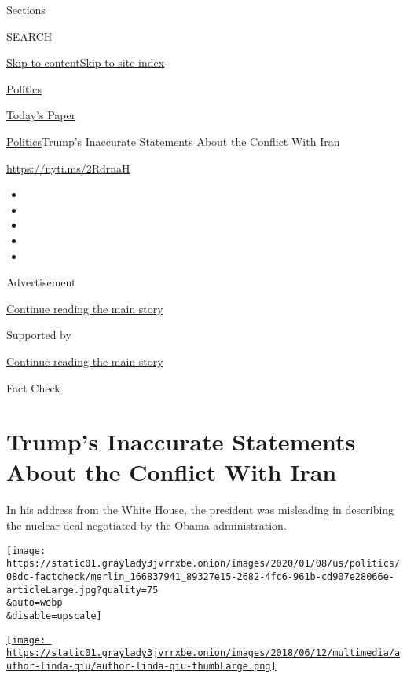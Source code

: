 Sections

SEARCH

\protect\hyperlink{site-content}{Skip to
content}\protect\hyperlink{site-index}{Skip to site index}

\href{https://www.nytimes3xbfgragh.onion/section/politics}{Politics}

\href{https://myaccount.nytimes3xbfgragh.onion/auth/login?response_type=cookie\&client_id=vi}{}

\href{https://www.nytimes3xbfgragh.onion/section/todayspaper}{Today's
Paper}

\href{/section/politics}{Politics}\textbar{}Trump's Inaccurate
Statements About the Conflict With Iran

\url{https://nyti.ms/2RdrnaH}

\begin{itemize}
\item
\item
\item
\item
\item
\end{itemize}

Advertisement

\protect\hyperlink{after-top}{Continue reading the main story}

Supported by

\protect\hyperlink{after-sponsor}{Continue reading the main story}

Fact Check

\hypertarget{trumps-inaccurate-statements-about-the-conflict-with-iran}{%
\section{Trump's Inaccurate Statements About the Conflict With
Iran}\label{trumps-inaccurate-statements-about-the-conflict-with-iran}}

In his address from the White House, the president was misleading in
describing the nuclear deal negotiated by the Obama administration.

\texttt{[image: https://static01.graylady3jvrrxbe.onion/images/2020/01/08/us/politics/08dc-factcheck/merlin\_166837941\_89327e15-2682-4fc6-961b-cd907e28066e-articleLarge.jpg?quality=75\\\&auto=webp\\\&disable=upscale]}

\href{https://www.nytimes3xbfgragh.onion/by/linda-qiu}{\texttt{[image: https://static01.graylady3jvrrxbe.onion/images/2018/06/12/multimedia/author-linda-qiu/author-linda-qiu-thumbLarge.png]}}

